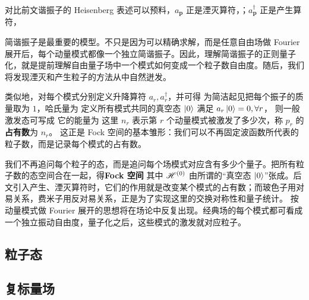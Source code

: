 对比前文谐振子的 Heisenberg 表述可以预料，$a_{\bm{p}}$ 正是湮灭算符，；$a^\dagger_{\bm{p}}$ 正是产生算符，


简谐振子是最重要的模型。不只是因为可以精确求解，而是任意自由场做 Fourier 展开后，每个动量模式都像一个独立简谐振子。因此，理解简谐振子的正则量子化，就是提前理解自由量子场中一个模式如何变成一个粒子数自由度。随后，我们将发现湮灭和产生粒子的方法从中自然迸发。













类似地，对每个模式分别定义升降算符 $a_r,a_r^\dagger$，并可得
为简洁起见把每个振子的质量取为 $1$，哈氏量为
定义所有模式共同的真空态 $\ket0$ 满足 $a_r\ket0=0,\forall r$，
则一般激发态可写成
它的能量为
这里 $n_r$ 表示第 $r$ 个动量模式被激发了多少次，称 $p_r$ 的\textbf{占有数}为 $n_r$。
这正是 Fock 空间的基本雏形：我们可以不再固定波函数所代表的粒子数，而是记录每个模式的占有数。

我们不再追问每个粒子的态，而是追问每个场模式对应含有多少个量子。把所有粒子数的态空间合在一起，得\textbf{Fock 空间}
其中 $\mathscr{H}^{(0)}$ 由所谓的“真空态 $\ket 0$”张成。后文引入产生、湮灭算符时，它们的作用就是改变某个模式的占有数；而玻色子用对易关系，费米子用反对易关系，正是为了实现这里的交换对称性和量子统计。
按动量模式做 Fourier 展开的思想将在场论中反复出现。经典场的每个模式都可看成一个独立振动自由度，量子化之后，这些模式的激发就对应粒子。

\subsection{粒子态}

\subsection{复标量场}

